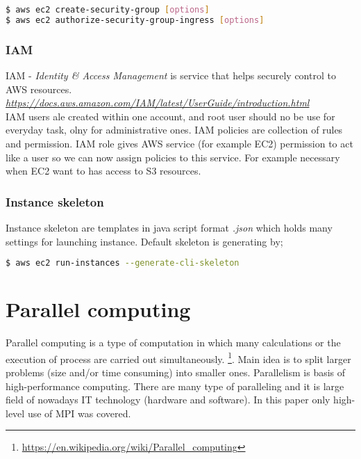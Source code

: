 \documentclass[11pt]{article}
\begin{document}
\begin{lstlisting}[language=bash]
$ aws ec2 create-security-group [options]
$ aws ec2 authorize-security-group-ingress [options]
\end{lstlisting}

\subsubsection{IAM}
IAM - \textit{Identity \& Access Management} is service that helps securely control to AWS resources. \textit{\url{https://docs.aws.amazon.com/IAM/latest/UserGuide/introduction.html}}\\
IAM users ale created within one account, and root user should no be use for everyday task, olny for administrative ones. IAM policies are collection of rules and permission. IAM role gives AWS service (for example EC2) permission to act like a user so we can now assign policies to this service. For example necessary when EC2 want to has access to S3 resources.

\subsubsection{Instance skeleton}
Instance skeleton are templates in java script format \textit{.json} which holds many settings for launching instance. Default skeleton is generating by;

\begin{lstlisting}[language=bash]
$ aws ec2 run-instances --generate-cli-skeleton
\end{lstlisting}

\section{Parallel computing}
Parallel computing is a type of computation in which many calculations or the execution of process are carried out simultaneously. \footnote{\url{https://en.wikipedia.org/wiki/Parallel_computing}}. Main idea is to split larger problems (size and/or time consuming) into smaller ones. Parallelism is basis of high-performance computing. There are many type of paralleling and it is large field of nowadays IT technology (hardware and software). In this paper only high-level use of MPI was covered.
\end{document}
